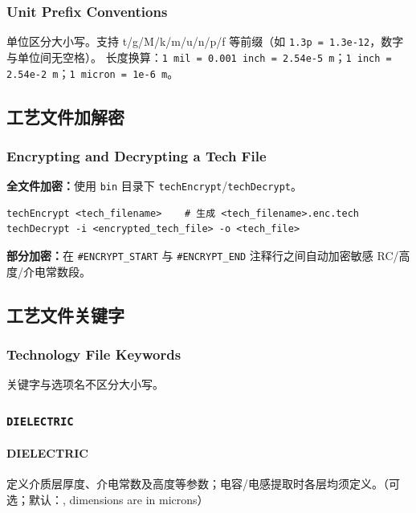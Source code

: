 \subsubsection*{Unit Prefix Conventions}

单位区分大小写。支持 t/g/M/k/m/u/n/p/f 等前缀（如 \texttt{1.3p = 1.3e-12}，数字与单位间无空格）。
长度换算：\texttt{1 mil = 0.001 inch = 2.54e-5 m}；\texttt{1 inch = 2.54e-2 m}；\texttt{1 micron = 1e-6 m}。

\subsection{工艺文件加解密}
\subsubsection*{Encrypting and Decrypting a Tech File}

\textbf{全文件加密：}使用 \texttt{bin} 目录下 \texttt{techEncrypt}/\texttt{techDecrypt}。
\begin{lstlisting}
techEncrypt <tech_filename>    # 生成 <tech_filename>.enc.tech
techDecrypt -i <encrypted_tech_file> -o <tech_file>
\end{lstlisting}

\textbf{部分加密：}在 \texttt{\#ENCRYPT\_START} 与 \texttt{\#ENCRYPT\_END} 注释行之间自动加密敏感 RC/高度/介电常数段。

\subsection{工艺文件关键字}
\subsubsection*{Technology File Keywords}

\begin{noteBox}
关键字与选项名不区分大小写。
\end{noteBox}

\subsubsection{\texttt{DIELECTRIC}}
\paragraph*{DIELECTRIC}

定义介质层厚度、介电常数及高度等参数；电容/电感提取时各层均须定义。（可选；默认：, dimensions are in microns）

